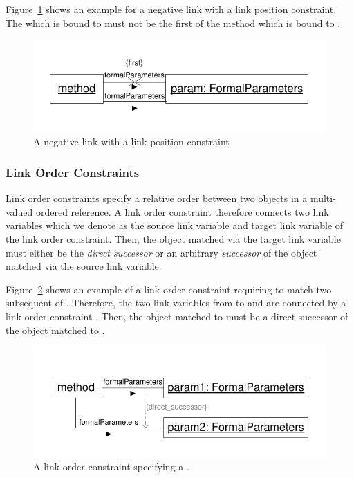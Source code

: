 {Figure~\ref{fig:linkPositionConstraintNegative} shows an example for a negative link with a link position constraint. The  which is bound to  must not be the first  of the method which is bound to .


\begin{figure}[htbp]
\center
\includegraphics[width=0.75\columnwidth]{figures/LinkPositionConstraintNegated}
\caption{A negative link with a  link position constraint}
\label{fig:linkPositionConstraintNegative}
\end{figure}



\subsubsection{Link Order Constraints}
\label{sec:StoryPatterns:linkConstraints:orderConstraint}

Link order constraints specify a relative order between two objects in a multi-valued ordered reference. A link order constraint therefore connects two link variables which we denote as the source link variable and target link variable of the link order constraint. Then, the object matched via the target link variable must either be the \emph{direct successor} or an arbitrary \emph{successor} of the object matched via the source link variable.

Figure~\ref{fig:linkOrderConstraintDirectSuccessor} shows an example of a link order constraint requiring to match two subsequent  of . Therefore, the two link variables from  to  and  are connected by a link order constraint . Then, the object matched to  must be a direct successor of the object matched to .

\begin{figure}[htbp]
\center
\includegraphics[width=0.75\columnwidth]{figures/LinkOrderConstraintDirectSuccessor}
\caption{A link order constraint specifying a .}
\label{fig:linkOrderConstraintDirectSuccessor}
\end{figure}

}
